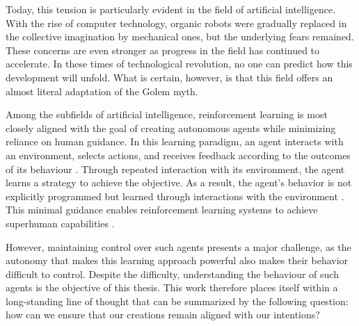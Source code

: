 Today, this tension is particularly evident in the field of artificial intelligence.
With the rise of computer technology, organic robots were gradually replaced in the collective imagination by mechanical ones, but the underlying fears remained.
These concerns are even stronger as progress in the field has continued to accelerate.
In these times of technological revolution, no one can predict how this development will unfold.
What is certain, however, is that this field offers an almost literal adaptation of the Golem myth.

Among the subfields of artificial intelligence, reinforcement learning is most closely aligned with the goal of creating autonomous agents while minimizing reliance on human guidance.
In this learning paradigm, an agent interacts with an environment, selects actions, and receives feedback according to the outcomes of its behaviour \parencite{sutton2018reinforcement}.
Through repeated interaction with its environment, the agent learns a strategy to achieve the objective.
As a result, the agent's behavior is not explicitly programmed but learned through interactions with the environment \parencite{amodei2016concrete}.
This minimal guidance enables reinforcement learning systems to achieve superhuman capabilities \parencite{silver2017mastering, openai2019dota2largescale}.

However, maintaining control over such agents presents a major challenge, as the autonomy that makes this learning approach powerful also makes their behavior difficult to control.
Despite the difficulty, understanding the behaviour of such agents is the objective of this thesis.
This work therefore places itself within a long-standing line of thought that can be summarized by the following question: how can we ensure that our creations remain aligned with our intentions?
